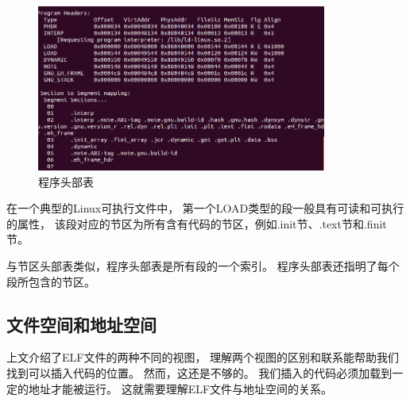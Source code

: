 
\begin{figure}[h!]
  \centering
  \includegraphics[width=0.85\textwidth]{figure/programs.png}
  \caption{程序头部表}
  \label{programs}
\end{figure}

在一个典型的Linux可执行文件中，
第一个LOAD类型的段一般具有可读和可执行的属性，
该段对应的节区为所有含有代码的节区，例如.init节、.text节和.finit节。

与节区头部表类似，程序头部表是所有段的一个索引。
程序头部表还指明了每个段所包含的节区。

\subsection{文件空间和地址空间}
\label{twoqs}
上文介绍了ELF文件的两种不同的视图，
理解两个视图的区别和联系能帮助我们找到可以插入代码的位置。
然而，这还是不够的。
我们插入的代码必须加载到一定的地址才能被运行。
这就需要理解ELF文件与地址空间的关系。

